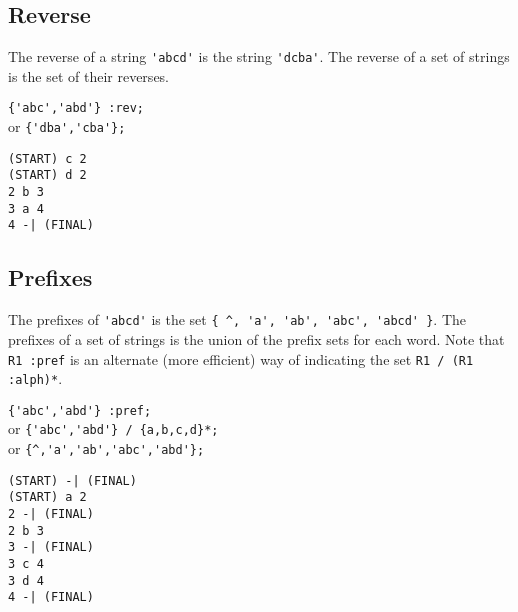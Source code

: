 \subsection{Reverse}
The reverse of a string \verb#'abcd'# is the string \verb#'dcba'#.
The reverse of a set of strings is the set of their reverses.
\begin{center}\begin{minipage}[t]{3in}\begin{minipage}[t]{3in}\begin{tabbing}
\qquad \= \verb#{'abc','abd'} :rev;#\\
or \> \verb#{'dba','cba'};#
\end{tabbing}\end{minipage}\end{minipage}
\begin{minipage}[t]{1.6in}\begin{verbatim}
(START) c 2
(START) d 2
2 b 3
3 a 4
4 -| (FINAL)
\end{verbatim}\end{minipage}\end{center}

\subsection{Prefixes}
The prefixes of \verb#'abcd'# is the set
\verb#{ ^, 'a', 'ab', 'abc', 'abcd' }#.
The prefixes of a set of strings is the union of the prefix sets for each
word.
Note that \verb#R1 :pref# is an alternate (more efficient) way of indicating
the set \verb#R1 / (R1 :alph)*#.
\begin{center}\begin{minipage}[t]{3in}\begin{minipage}[t]{3in}\begin{tabbing}
\qquad \= \verb#{'abc','abd'} :pref;#\\
or \> \verb#{'abc','abd'} / {a,b,c,d}*;#\\
or \> \verb#{^,'a','ab','abc','abd'};#
\end{tabbing}\end{minipage}\end{minipage}
\begin{minipage}[t]{1.6in}\begin{verbatim}
(START) -| (FINAL)
(START) a 2
2 -| (FINAL)
2 b 3
3 -| (FINAL)
3 c 4
3 d 4
4 -| (FINAL)
\end{verbatim}\end{minipage}\end{center}

